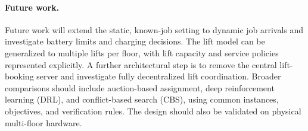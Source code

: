 \documentclass[11pt]{article}
\begin{document}
\paragraph{Future work.}
Future work will extend the static, known-job setting to dynamic job arrivals
and investigate battery limits and charging decisions. The lift model can
be generalized to multiple lifts per floor, with lift capacity and service
policies represented explicitly. A further architectural step is to remove
the central lift-booking server and investigate fully decentralized lift
coordination. Broader comparisons should include auction-based assignment,
deep reinforcement learning (DRL), and conflict-based search (CBS), using
common instances, objectives, and verification rules. The design should also
be validated on physical multi-floor hardware.
\end{document}
